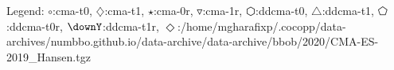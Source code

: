 Legend: {\color{NavyBlue}$\circ$}:cma-t0, {\color{Magenta}$\diamondsuit$}:cma-t1, {\color{Orange}$\star$}:cma-0r, {\color{CornflowerBlue}$\triangledown$}:cma-1r, {\color{red}$\varhexagon$}:ddcma-t0, {\color{YellowGreen}$\triangle$}:ddcma-t1, {\color{cyan}$\pentagon$}:ddcma-t0r, {\color{ForestGreen}$\downY$}:ddcma-t1r, {\color{Lavender}$\Diamond$}:/home/mgharafixp/.cocopp/data-archives/numbbo.github.io/data-archive/data-archive/bbob/2020/CMA-ES-2019\_Hansen.tgz